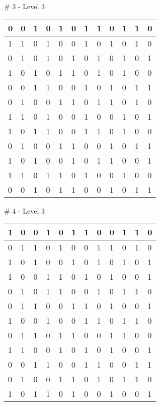 \smallskip

\# 3 - Level 3 \newline
\begin{tabular}{|m{\collen}|m{\collen}|m{\collen}|m{\collen}|m{\collen}|m{\collen}|m{\collen}|m{\collen}|m{\collen}|m{\collen}|m{\collen}|m{\collen}|}
\hline
  0 & 0 & 1 & 0 & 1 & 0 & 1 & 1 & 0 & 1 & 1 & 0 \\
\hline
  1 & 1 & 0 & 1 & 0 & 0 & 1 & 0 & 1 & 0 & 1 & 0 \\
\hline
  0 & 1 & 0 & 1 & 0 & 1 & 0 & 1 & 0 & 1 & 0 & 1 \\
\hline
  1 & 0 & 1 & 0 & 1 & 1 & 0 & 1 & 0 & 1 & 0 & 0 \\
\hline
  0 & 0 & 1 & 1 & 0 & 0 & 1 & 0 & 1 & 0 & 1 & 1 \\
\hline
  0 & 1 & 0 & 0 & 1 & 1 & 0 & 1 & 1 & 0 & 1 & 0 \\
\hline
  1 & 1 & 0 & 1 & 0 & 0 & 1 & 0 & 0 & 1 & 0 & 1 \\
\hline
  1 & 0 & 1 & 1 & 0 & 0 & 1 & 1 & 0 & 1 & 0 & 0 \\
\hline
  0 & 1 & 0 & 0 & 1 & 1 & 0 & 0 & 1 & 0 & 1 & 1 \\
\hline
  1 & 0 & 1 & 0 & 0 & 1 & 0 & 1 & 1 & 0 & 0 & 1 \\
\hline
  1 & 1 & 0 & 1 & 1 & 0 & 1 & 0 & 0 & 1 & 0 & 0 \\
\hline
  0 & 0 & 1 & 0 & 1 & 1 & 0 & 0 & 1 & 0 & 1 & 1 \\
\hline
\end{tabular}


\smallskip

\# 4 - Level 3 \newline
\begin{tabular}{|m{\collen}|m{\collen}|m{\collen}|m{\collen}|m{\collen}|m{\collen}|m{\collen}|m{\collen}|m{\collen}|m{\collen}|m{\collen}|m{\collen}|}
\hline
  1 & 0 & 0 & 1 & 0 & 1 & 1 & 0 & 0 & 1 & 1 & 0 \\
\hline
  0 & 1 & 1 & 0 & 1 & 0 & 0 & 1 & 1 & 0 & 1 & 0 \\
\hline
  1 & 0 & 1 & 0 & 0 & 1 & 0 & 1 & 0 & 1 & 0 & 1 \\
\hline
  1 & 0 & 0 & 1 & 1 & 0 & 1 & 0 & 1 & 0 & 0 & 1 \\
\hline
  0 & 1 & 0 & 1 & 1 & 0 & 0 & 1 & 0 & 1 & 1 & 0 \\
\hline
  0 & 1 & 1 & 0 & 0 & 1 & 1 & 0 & 1 & 0 & 0 & 1 \\
\hline
  1 & 0 & 0 & 1 & 0 & 0 & 1 & 1 & 0 & 1 & 1 & 0 \\
\hline
  0 & 1 & 1 & 0 & 1 & 1 & 0 & 0 & 1 & 1 & 0 & 0 \\
\hline
  1 & 1 & 0 & 0 & 1 & 0 & 1 & 0 & 1 & 0 & 0 & 1 \\
\hline
  0 & 0 & 1 & 1 & 0 & 0 & 1 & 1 & 0 & 0 & 1 & 1 \\
\hline
  0 & 1 & 0 & 0 & 1 & 1 & 0 & 1 & 0 & 1 & 1 & 0 \\
\hline
  1 & 0 & 1 & 1 & 0 & 1 & 0 & 0 & 1 & 0 & 0 & 1 \\
\hline
\end{tabular}


